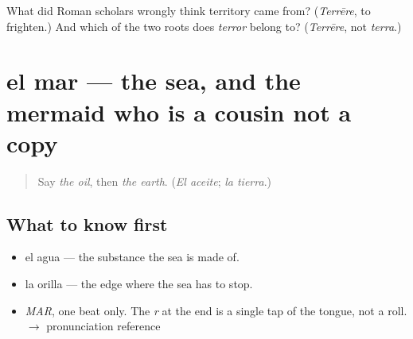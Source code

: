 \begin{tcolorbox}[breakable,colback=teal!4,colframe=teal!35!black,title={Before you move on}]
What did Roman scholars wrongly think territory came from? (\emph{Terrēre}, to frighten.) And which of the two roots does \emph{terror} belong to? (\emph{Terrēre}, not \emph{terra}.)
\end{tcolorbox}
\section[el mar]{el mar — the sea, and the mermaid who is a cousin not a copy}

\label{lesson:ES-C362-mar}



\begin{quote}
Say \emph{the oil}, then \emph{the earth}. (\emph{El aceite}; \emph{la tierra}.)
\end{quote}

\subsection*{What to know first}
\begin{itemize}
\raggedright
  \item el agua — the substance the sea is made of.
  \item la orilla — the edge where the sea has to stop.
\end{itemize}

\begin{sounds}
\begin{itemize}
\raggedright
  \item \emph{MAR}, one beat only. The \emph{r} at the end is a single tap of the tongue, not a roll. $\to$ pronunciation reference
\end{itemize}
\end{sounds}

